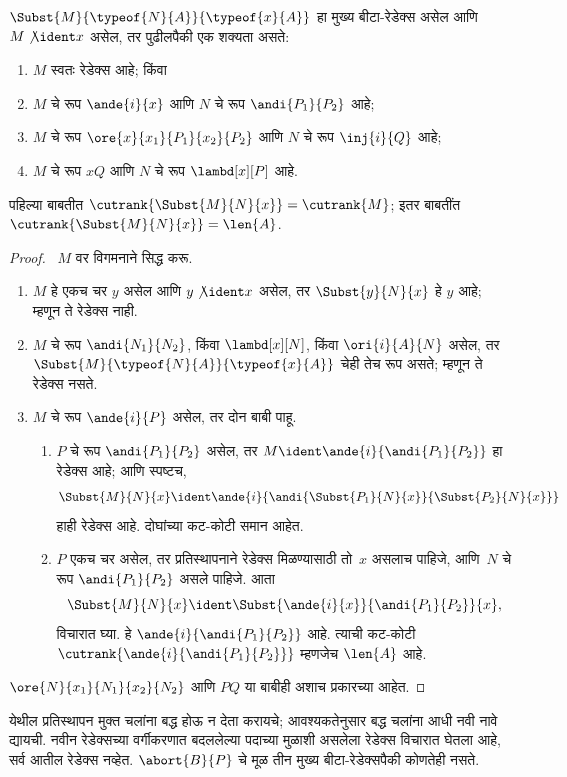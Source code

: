 \begin{lem}\label{int:pty:nor:lem:subst}
  $\Subst{M}{\typeof{N}{A}}{\typeof{x}{A}}$ हा मुख्य बीटा-रेडेक्स असेल
  आणि $M \not\ident x$ असेल, तर पुढीलपैकी एक शक्यता असते:
  \begin{enumerate}
  \item $M$ स्वतः रेडेक्स आहे; किंवा
  \item $M$ चे रूप $\ande{i}{x}$ आणि $N$ चे रूप
    $\andi{P_1}{P_2}$ आहे;
  \item $M$ चे रूप $\ore{x}{x_1}{P_1}{x_2}{P_2}$ आणि $N$ चे
    रूप $\inj{i}{Q}$ आहे;
  \item $M$ चे रूप $x Q$ आणि $N$ चे रूप
    $\lambd[x][P]$ आहे.
  \end{enumerate}
  पहिल्या बाबतीत $\cutrank{\Subst{M}{N}{x}} = \cutrank{M}$;
  इतर बाबतींत $\cutrank{\Subst{M}{N}{x}} = \len{A}$.
\end{lem}
\begin{proof}
  ~$M$ वर विगमनाने सिद्ध करू.
  \begin{enumerate}
  \item $M$ हे एकच चर $y$ असेल आणि $y \not\ident x$ असेल,
    तर $\Subst{y}{N}{x}$ हे $y$ आहे; म्हणून ते रेडेक्स नाही.
  \item $M$ चे रूप $\andi{N_1}{N_2}$, किंवा $\lambd[x][N]$,
    किंवा $\ori{i}{A}{N}$ असेल, तर
    $\Subst{M}{\typeof{N}{A}}{\typeof{x}{A}}$ चेही तेच
    रूप असते; म्हणून ते रेडेक्स नसते.
  \item $M$ चे रूप $\ande{i}{P}$ असेल, तर दोन बाबी पाहू.
    \begin{enumerate}
      \item $P$ चे रूप $\andi{P_1}{P_2}$ असेल, तर
        $M \ident \ande{i}{\andi{P_1}{P_2}}$ हा रेडेक्स आहे;
        आणि स्पष्टच,
        \[
        \Subst{M}{N}{x} \ident
        \ande{i}{\andi{\Subst{P_1}{N}{x}}{\Subst{P_2}{N}{x}}}
        \]
        हाही रेडेक्स आहे. दोघांच्या कट-कोटी समान आहेत.
      \item $P$ एकच चर असेल, तर प्रतिस्थापनाने रेडेक्स
        मिळण्यासाठी तो~$x$ असलाच पाहिजे, आणि~$N$ चे रूप
        $\andi{P_1}{P_2}$ असले पाहिजे. आता
        \[
        \Subst{M}{N}{x} \ident \Subst{\ande{i}{x}}{\andi{P_1}{P_2}}{x},
        \]
        विचारात घ्या. हे $\ande{i}{\andi{P_1}{P_2}}$ आहे.
        त्याची कट-कोटी $\cutrank{\ande{i}{\andi{P_1}{P_2}}}$
        म्हणजेच $\len{A}$ आहे.
    \end{enumerate}
  \end{enumerate}
  $\ore{N}{x_1}{N_1}{x_2}{N_2}$ आणि $P Q$ या बाबीही
  अशाच प्रकारच्या आहेत.
\end{proof}
येथील प्रतिस्थापन मुक्त चलांना बद्ध होऊ न देता करायचे;
आवश्यकतेनुसार बद्ध चलांना आधी नवी नावे द्यायची.
नवीन रेडेक्सच्या वर्गीकरणात बदललेल्या पदाच्या
मुळाशी असलेला रेडेक्स विचारात घेतला आहे, सर्व
आतील रेडेक्स नव्हेत. $\abort{B}{P}$ चे मूळ
तीन मुख्य बीटा-रेडेक्सपैकी कोणतेही नसते.

